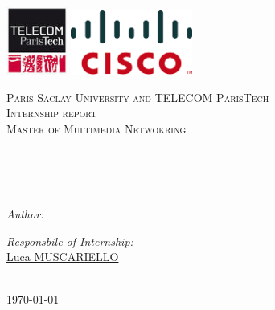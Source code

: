 \documentclass[11pt, oneside]{Thesis} %
\begin{document}
\begin{titlepage}

\begin{center}
 \includegraphics[width=0.15\textwidth,natwidth=610,natheight=642]{telecom.jpeg}
 \includegraphics[width=0.3\textwidth,natwidth=610,natheight=642]{cisco.png}

\textsc{\LARGE Paris Saclay University and TELECOM ParisTech}\\[1.5cm] %
\textsc{\Large Internship report \\ Master of Multimedia Netwokring} %

\HRule \\[0.2cm] %
{\huge \bfseries \ttitle}\\[0.4cm] %
\HRule \\[1.2cm] %


\begin{minipage}{0.4\textwidth}

\begin{flushleft} \large
\emph{Author:}\\
{\authornames} %
\end{flushleft}
\end{minipage}
\begin{minipage}{0.4\textwidth}

\begin{flushright} \large
\emph{Responsbile of Internship:}\\
\href{https://scholar.google.com/citations?user=Q36qUAsAAAAJ&hl=fr}{Luca MUSCARIELLO}\\
\end{flushright}

\end{minipage}\\[1.8cm]






{\large \today}
\vfill
\end{center}

\end{titlepage}
\end{document}
